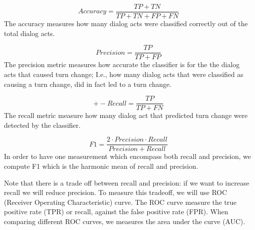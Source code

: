 \begin{equation}
Accuracy = \frac{TP + TN}{TP + TN + FP + FN}
\end{equation}
The accuracy measures how many dialog acts were classified correctly out of the total dialog acts.

\begin{equation}
Precision = \frac{TP }{TP + FP}
\end{equation}
The precision metric measures how accurate the classifier is for the the dialog acts that caused turn change; I.e., how many dialog acts that were classified as causing a turn change, did in fact led to a turn change.

\begin{equation}+-
Recall = \frac{TP }{TP + FN}
\end{equation}
The recall metric measure how many dialog act that predicted turn change were detected by the classifier.

\begin{equation}
F1 = \frac{2 \cdot Precision\cdot Recall}{Precision+ Recall}
\end{equation}
In order to have one measurement which encompass both recall and precision, we compute F1 which is the
harmonic mean of recall and precision.

Note that there is a trade off between recall and precision: if we want to increase recall we will reduce precision. To measure this tradeoff, we will use ROC (Receiver Operating Characteristic) curve.
The ROC curve measure the true positive rate (TPR) or recall, against the false positive rate (FPR).
When comparing different ROC curves, we measures the area under the curve (AUC).

